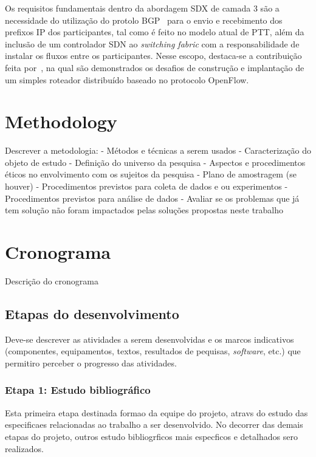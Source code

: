 Os requisitos fundamentais dentro da abordagem SDX de camada 3 são a necessidade do utilização do protolo BGP~\cite{rfc4271} para o envio e recebimento dos prefixos IP dos participantes, tal como é feito no modelo atual de PTT, além da inclusão de um controlador SDN ao \textit{switching fabric} com a responsabilidade de instalar os fluxos entre os participantes. Nesse escopo, destaca-se a contribuição feita por~\cite{stringer2013cardigan}, na qual são demonstrados os desafios de construção e implantação de um simples roteador distribuído baseado no protocolo OpenFlow.

\chapter{Methodology}
Descrever a metodologia:
- Métodos e técnicas a serem usados
- Caracterização do objeto de estudo
- Definição do universo da pesquisa
- Aspectos e procedimentos éticos no envolvimento com os sujeitos da pesquisa
- Plano de amostragem (se houver)
- Procedimentos previstos para coleta de dados e ou experimentos
- Procedimentos previstos para análise de dados
- Avaliar se os problemas que já tem solução não foram impactados pelas soluções propostas neste trabalho

\chapter{Cronograma}
Descrição do cronograma
\section{Etapas do desenvolvimento}
\label{s_etapas}

Deve-se descrever as atividades a serem desenvolvidas e os marcos indicativos (componentes, equipamentos, textos, resultados de pequisas, \textit{software}, etc.) que permitiro perceber o progresso das atividades.

\subsection*{Etapa 1: Estudo bibliográfico}
\renewcommand{\labelenumi}{\arabic{etapas}.\theenumi}
\setcounter{etapas}{1}

Esta primeira etapa  destinada  formao da equipe do projeto, atravs do estudo das especificaes relacionadas ao trabalho a ser desenvolvido. No decorrer das demais etapas do projeto, outros estudo bibliogrficos mais especficos e detalhados sero realizados.

